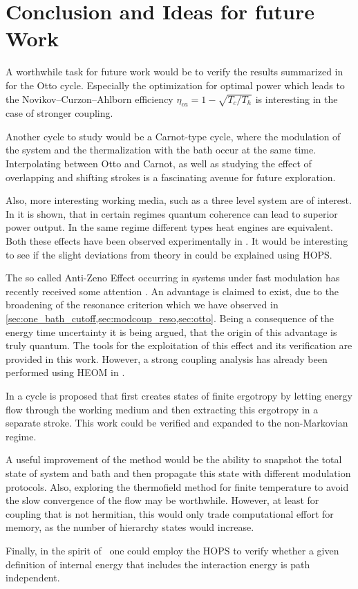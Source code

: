 \chapter{Conclusion and Ideas for future Work}
\label{cha:concl-ideas-future}
A worthwhile task for future work would be to verify the results
summarized in  for the Otto cycle. Especially the
optimization for optimal power which leads to the
Novikov–Curzon–Ahlborn efficiency \(η_{ca}=1-\sqrt{T_{c}/T_{h}}\) is
interesting in the case of stronger coupling.

Another cycle to study would be a Carnot-type cycle, where the
modulation of the system and the thermalization with the bath occur at
the same time. Interpolating between Otto and Carnot, as well as
studying the effect of overlapping and shifting strokes is a
fascinating avenue for future exploration.

Also, more interesting working media, such as a three level system are
of interest. In  it is shown, that in certain
regimes quantum coherence can lead to superior power output. In the
same regime different types heat engines are equivalent. Both these
effects have been observed experimentally in . It
would be interesting to see if the slight deviations from theory in
\cite{Klatzow2019Mar} could be explained using HOPS.

The so called Anti-Zeno Effect occurring in systems under fast
modulation has recently received some attention
\cite{Mukherjee2020Jan,Xu2022Mar}. An advantage is claimed to exist,
due to the broadening of the resonance criterion which we have
observed in
\cref{sec:one_bath_cutoff,sec:modcoup_reso,sec:otto}. Being a
consequence of the energy time uncertainty it is being argued, that
the origin of this advantage is truly quantum. The tools for the
exploitation of this effect and its verification are provided in this
work. However, a strong coupling analysis has already been performed
using HEOM in .

In  a cycle is proposed that first creates states
of finite ergotropy by letting energy flow through the working medium
and then extracting this ergotropy in a separate stroke. This work
could be verified and expanded to the non-Markovian regime.

A useful improvement of the method would be the ability to snapshot
the total state of system and bath and then propagate this state with
different modulation protocols. Also, exploring the thermofield method
for finite temperature to avoid the slow convergence of the flow may
be worthwhile. However, at least for coupling that is not hermitian,
this would only trade computational effort for memory, as the number
of hierarchy states would increase.

Finally, in the spirit of~\cite{Esposito2015Dec} one could employ the
HOPS to verify whether a given definition of internal energy that
includes the interaction energy is path independent.

